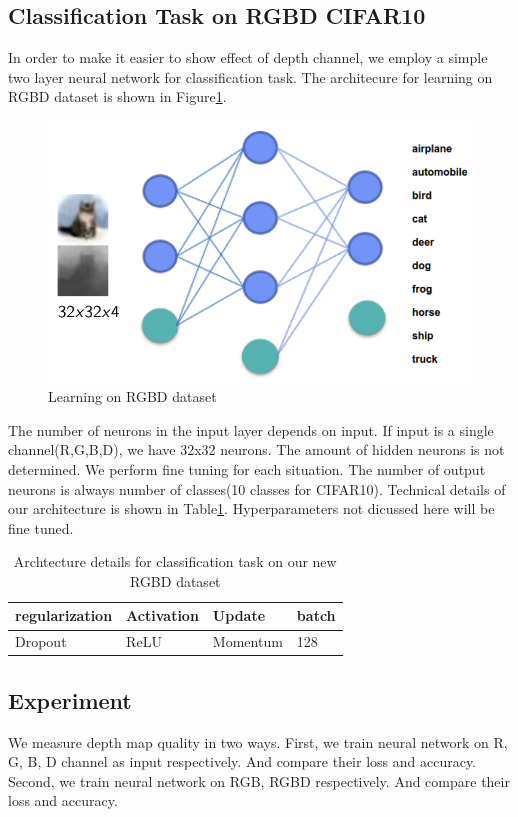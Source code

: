 \documentclass[10pt,twocolumn,letterpaper]{article}
\begin{document}
\subsection{Classification Task on RGBD CIFAR10}
In order to make it easier to show effect of depth channel,
 we employ a simple two layer neural network for classification task.
 The architecure for learning on RGBD dataset is shown in Figure\ref{fig:tarch}. 
 \begin{figure}
\includegraphics[width=\linewidth]{../Tarch.png}
\caption{Learning on RGBD dataset}
\label{fig:tarch}
\end{figure}
The number of neurons in the input layer depends on input.
If input is a single channel(R,G,B,D), we have 32x32 neurons.
The amount of hidden neurons is not determined. We perform fine tuning 
for each situation. The number of output neurons is always number of classes(10 classes
for CIFAR10). Technical details of our architecture is shown in Table\ref{tab:details}. 
Hyperparameters not dicussed here will be fine tuned.
\begin{table}
\begin{center}
\begin{tabular}{|l|l|l|l|}
\hline
regularization&Activation&Update&batch\\
\hline
Dropout&ReLU&Momentum&128\\
\hline
\end{tabular}
\end{center}
\caption{Archtecture details for classification task on our new RGBD dataset}
\label{tab:details}
\end{table}


\subsection{Experiment}
We measure depth map quality in two ways. 
First, we train neural network on R, G, B, D channel as input respectively.
And compare their loss and accuracy. 
Second, we train neural network on RGB, RGBD respectively. 
And compare their loss and accuracy.
\end{document}

